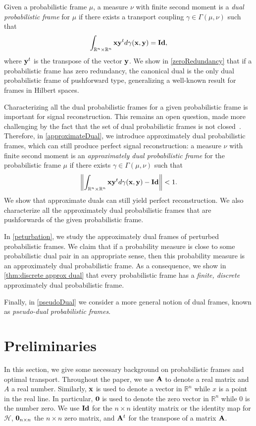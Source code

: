 \documentclass{amsart}
\numberwithin{equation}{section}
\theoremstyle{plain}
\theoremstyle{remark}
\theoremstyle{definition}
\begin{document}
Given a probabilistic frame $\mu$, a measure $\nu$ with finite second moment is a \emph{dual probabilistic frame} for $\mu$ if there exists a transport coupling $\gamma \in \Gamma(\mu, \nu)$ such that 
\begin{equation*}
   \int_{\mathbb{R}^n \times \mathbb{R}^n} {\bf x}{\bf y}^t d\gamma({\bf x}, {\bf y}) = {\bf Id},
\end{equation*} 
where ${\bf y}^t$ is the transpose of the vector ${\bf y}$. We show in \cref{zeroRedundancy} that if a probabilistic frame has zero redundancy, the canonical dual is the only dual probabilistic frame of pushforward type, generalizing a well-known result for frames in Hilbert spaces. 

Characterizing all the dual probabilistic frames for a given probabilistic frame is important for signal reconstruction. This remains an open question, made more challenging by the fact that the set of dual probabilistic frames is not closed~\cite{chen2024general}. Therefore, in \cref{approximateDual},  we introduce approximately dual probabilistic frames, which can still produce perfect signal reconstruction: a measure $\nu$ with finite second moment is an \textit{approximately dual probabilistic frame} for the probabilistic frame $\mu$ if there exists $\gamma \in \Gamma(\mu, \nu)$ such that 
\begin{equation*}
   \left \| \int_{\mathbb{R}^n \times \mathbb{R}^n} {\bf x}{\bf y}^t d\gamma({\bf x}, {\bf y}) - {\bf Id} \right \|<1.
\end{equation*} 
We show that approximate duals can still yield perfect reconstruction.  
We also characterize all the approximately dual probabilistic frames that are pushforwards of the given probabilistic frame. 

In \cref{peturbation}, we study the approximately dual frames of perturbed probabilistic frames. We claim that if a probability measure is close to some probabilistic dual pair in an appropriate sense, then this probability measure is an approximately dual probabilistic frame. As a consequence, we show in \cref{thm:discrete approx dual} that every probabilistic frame has a \emph{finite, discrete} approximately dual probabilistic frame.

Finally, in \cref{pseudoDual} we consider a more general notion of dual frames, known as \emph{pseudo-dual probabilistic frames}. 


\section{Preliminaries}\label{preliminary}
In this section, we give some necessary background on probabilistic frames and optimal transport. Throughout the paper,  we use ${\bf A}$ to denote a real matrix and $A$ a real number. Similarly,  ${\bf x}$ is used to denote a vector in $\mathbb{R}^n$ while $x$ is a point in the real line. In particular, ${\bf 0}$ is used to denote the zero vector in $\mathbb{R}^n$ while $0$ is the number zero. We use ${\bf Id}$ for the $n \times n$ identity matrix or the identity map for $\mathcal{H}$, ${\bf 0}_{n \times n}$ the $n \times n$ zero matrix, and  ${\bf A}^t$ for the transpose of a matrix ${\bf A}$. 
\end{document}

